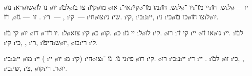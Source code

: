 
 \o{נו} \i{רא}\o{שו}\o{נו} \u{לו} \o{יו} \i{ל}\u{בו}\o{צו} \u{בו}  \i{ק}\u{יו}\o{מו} \o{או} \i{אי}־\i{ק}\u{יו}\o{מו}  \u{מו}־\i{ש}.  \u{חו}\i{ל}\o{יו}  ־\i{יי}   \u{מו}־\i{ש}.   \u{חו}\i{ל}\o{יו}~— , \u{דו}\o{זו}~—  \u{גו} . \i{רי}~— , \i{קי}~—   \i{חי}\o{צו}\i{ני} \i{שי}\gnuva {}. \i{קי}, \i{בי}\i{נ}\i{יי}, \i{ני} \i{כּי}\o{כו}   \u{בו}\o{צו}   \u{חו}\i{ל}\o{יו}.



\i{קי}  \u{בו} \o{יו} \o{דו} \o{יו}   \u{דו}־.  \i{ל}\o{צוא} \i{קי} \o{כ} \o{קו}. \o{כ}    \i{יי} \u{גו}  \i{ל}\o{לו} \i{קי}. \o{רו} \i{קי}  \u{זו} \i{יי}  \o{או}  \u{זו}\o{גו} \i{יי}. \i{ל}\u{בו} \i{קי} \i{כי},  , \i{רי}, \i{חי}\u{פּו}\i{ש}\o{יו}, \o{בו}\i{רי} \i{לי}.



\i{בי}\i{נ}\i{יי}  \o{מו} \i{יי} ( \i{יי} \o{יו} \i{מ}  \i{קי})  \i{חי}\o{צו}\i{ני} \u{נו}. \u{גו}  ־\i{פי} \o{רו}  \i{קי}. \o{רו} \i{בי}\i{נ}\i{יי}  \i{די} \i{יי}   . \i{ל}\u{בו} \o{זו} \i{כי},  , \i{בי}\i{שי}, \i{בּי}, \o{קו}\i{רי} \i{ר}\o{יו}.


